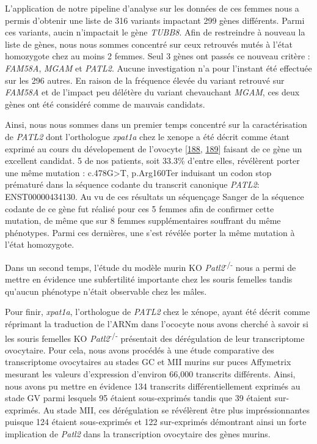 \documentclass[12pt,twoside]{reedthesis}
\theoremstyle{definition}
\theoremstyle{definition}
\theoremstyle{remark}
\begin{document}
  L'application de notre pipeline d'analyse sur les données de ces femmes
  nous a permis d'obtenir une liste de 316 variants impactant 299 gènes
  différents. Parmi ces variants, aucin n'impactait le gène \emph{TUBB8}.
  Afin de restreindre à nouveau la liste de gènes, nous nous sommes
  concentré sur ceux retrouvés mutés à l'état homozygote chez au moins 2
  femmes. Seul 3 gènes ont passés ce nouveau critère : \emph{FAM58A},
  \emph{MGAM} et \emph{PATL2}. Aucune investigation n'a pour l'instant été
  effectuée sur les 296 autres. En raison de la fréquence élevée du
  variant retrouvé sur \emph{FAM58A} et de l'impact peu délétère du
  variant chevauchant \emph{MGAM}, ces deux gènes ont été considéré comme
  de mauvais candidats.
  
  Ainsi, nous nous sommes dans un premier temps concentré sur la
  caractérisation de \emph{PATL2} dont l'orthologue \emph{xpat1a} chez le
  xenope a été décrit comme étant exprimé au cours du dévelopement de
  l'ovocyte {[}\protect\hyperlink{ref-Marnef2010}{188},
  \protect\hyperlink{ref-Nakamura2010}{189}{]} faisant de ce gène un
  excellent candidat. 5 de nos patients, soit 33.3\% d'entre elles,
  révélèrent porter une même mutation : c.478G\textgreater{}T, p.Arg160Ter
  induisant un codon stop prématuré dans la séquence codante du transcrit
  canonique \emph{PATL2}: ENST00000434130. Au vu de ces résultats un
  séquençage Sanger de la séquence codante de ce gène fut réalisé pour ces
  5 femmes afin de confirmer cette mutation, de même que sur 8 femmes
  supplémentaires souffrant du même phénotypes. Parmi ces dernières, une
  s'est révélée porter la même mutation à l'état homozygote.
  
  Dans un second temps, l'étude du modèle murin KO
  \emph{Patl2}\textsuperscript{-/-} nous a permi de mettre en évidence une
  subfertilité importante chez les souris femelles tandis qu'aucun
  phénotype n'était observable chez les mâles.
  
  Pour finir, \emph{xpat1a}, l'orthologue de \emph{PATL2} chez le xénope,
  ayant été décrit comme réprimant la traduction de l'ARNm dans l'ococyte
  nous avons cherché à savoir si les souris femelles KO
  \emph{Patl2}\textsuperscript{-/-} présentait des dérégulation de leur
  transcriptome ovocytaire. Pour cela, nous avons procédés à une étude
  comparative des transcriptome ovocytaires au stades GC et MII murins sur
  puces Affymetrix mesurant les valeurs d'expression d'environ 66,000
  transcrits différents. Ainsi, nous avons pu mettre en évidence 134
  transcrits différentiellement exprimés au stade GV parmi lesquels 95
  étaient sous-exprimés tandis que 39 étaient sur-exprimés. Au stade MII,
  ces dérégulation se révélèrent être plus impréssionnantes puisque 124
  étaient sous-exprimés et 122 sur-exprimés démontrant ainsi un forte
  implication de \emph{Patl2} dans la transcription ovocytaire des gènes
  murins.
  
\end{document}
